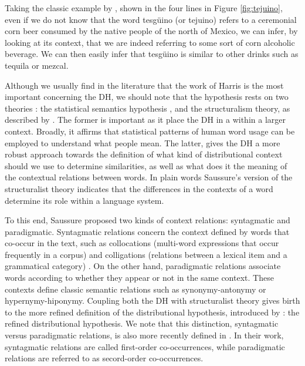 Taking the classic example by \cite{nida1979componential}, shown in the four lines  in Figure \ref{fig:tejuino}, even if we do not know that the word tesg\"{u}ino (or tejuino) refers to a ceremonial corn beer consumed by the native people of the north of Mexico, we can infer, by looking at its context, that we are indeed referring to some sort of corn alcoholic beverage. We can then easily infer that tesg\"{u}ino is similar to other drinks such as tequila or mezcal.



Although we usually find in the literature that the work of Harris is the most important concerning the DH, we should note that the hypothesis rests on two theories  \cite{sahlgren2008distributional,turney2010}: the statistical semantics hypothesis \cite{booth1955machine}, and the  structuralism theory, as described by \cite{de1916course}. The former is important as it place the DH in a within a larger context. Broadly, it affirms that statistical patterns of human word usage can be employed to understand what people mean. The latter,  gives the DH a more robust approach towards the definition of what kind of distributional context should we use to determine similarities, as well as what does it the meaning of the contextual relations between words. In plain words Saussure's version of the structuralist theory indicates that the differences in the contexts of a word determine its role within a language system. 

To this end, Saussure proposed two kinds of context relations: syntagmatic and paradigmatic. Syntagmatic relations concern the context defined by words that co-occur in the text, such as collocations (multi-word expressions that occur frequently in a corpus) and colligations (relations between a lexical item and a grammatical category) \cite{verschueren2015handbook}. On the other hand, paradigmatic relations associate words according to whether they appear or not in the same context. These contexts define classic semantic relations such as synonymy-antonymy or hypernymy-hiponymy. Coupling both the DH with structuralist theory gives birth to the more refined definition of the distributional hypothesis, introduced by \cite{sahlgren2008distributional}: the refined distributional hypothesis. We note that this distinction, syntagmatic versus paradigmatic relations, is also more recently defined in \cite{schutze1993vector}. In their work, syntagmatic relations are called first-order co-occurrences, while paradigmatic relations  are referred to as secord-order co-occurrences.

